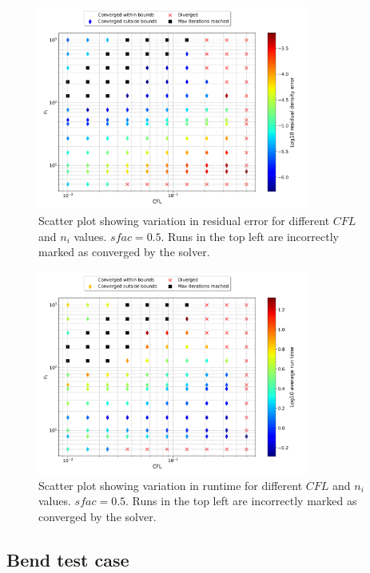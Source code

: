 \documentclass{article}
\begin{document}
\begin{figure}[H]
    \centering
    \includegraphics[width=0.8\textwidth]{figures/bump_ni_cfl_residual.png}
    \caption{Scatter plot showing variation in residual error for different $CFL$ and $n_i$ values. $sfac = 0.5$. Runs in the top left are incorrectly marked as converged by the solver.}
    \label{fig:bump_ni_cfl_residual}
\end{figure}

\begin{figure}[H]
    \centering
    \centering
    \includegraphics[width=0.8\textwidth]{figures/bump_ni_cfl_time.png}
    \caption{Scatter plot showing variation in runtime for different $CFL$ and $n_i$ values. $sfac = 0.5$. Runs in the top left are incorrectly marked as converged by the solver.}
    \label{fig:bump_ni_cfl_time}
\end{figure}

\subsection{Bend test case}
\end{document}
